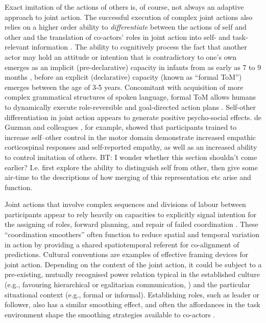 Exact imitation of the actions of others is, of course, not always an adaptive approach to joint action.  The successful execution of complex joint actions also relies on a higher order ability to \textit{differentiate} between the actions of self and other and the translation of co-actors' roles in joint action into self- and task-relevant information \citep{Novembre2012,Sowden2014,Milward2016}.
The ability to cognitively process the fact that another actor may hold an attitude or intention that is contradictory to one's own emerges as an implicit (pre-declarative) capacity in infants from as early as 7 to 9 months \citep{Baron-Cohen1991}, before an explicit (declarative) capacity (known as ``formal ToM'') emerges between the age of 3-5 years. Concomitant with acquisition of more complex grammatical structures of spoken language, formal ToM allows humans to dynamically execute role-reversible and goal-directed action plans \citep{Tomasello2005a,Tomasello2008,Tomasello2014}.  Self-other differentiation in joint action appears to generate positive psycho-social effects.  de Guzman and colleagues \textcite{DeGuzman2015}, for example, showed that participants trained to increase self–other control in the motor domain demonstrate increased empathic corticospinal responses and self-reported empathy, as well as an increased ability to control imitation of others.
BT: I wonder whether this section shouldn’t come earlier? I.e. first explore the ability to distinguish self from other, then give some air-time to the descriptions of how merging of this representation etc arise and function.

Joint actions that involve complex sequences and divisions of labour between participants appear to rely heavily on capacities to explicitly signal intention for the assigning of roles, forward planning, and repair of failed coordination \citep{Frith2010}. These ``coordination smoothers'' \citep{Vesper2017} often function to reduce spatial and temporal variation in action by providing a shared spatiotemporal referent for co-alignment of predictions.  Cultural conventions are examples of effective framing devices for joint action.  Depending on the context of the joint action, it could be subject to a pre-existing, mutually recognised power relation typical in the established culture (e.g., favouring hierarchical or egalitarian communication, \citep[see]{Cheon2011}) and the particular situational context (e.g., formal or informal).
Establishing roles, such as leader or follower, also has a similar smoothing effect, and often the affordances in the task environment shape the smoothing strategies available to co-actors \citep{Marsh2009}.

